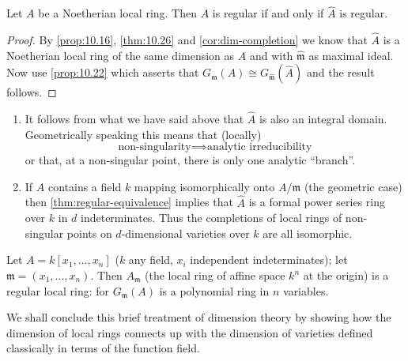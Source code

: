 \begin{proposition}\label{prop:regular-completion}
Let $A$ be a Noetherian local ring. Then $A$ is regular if and only if $\widehat{A}$ is regular.
\end{proposition}

\begin{proof}
By \eqref{prop:10.16}, \eqref{thm:10.26} and \eqref{cor:dim-completion} we know that $\widehat{A}$ is a Noetherian local ring of the same dimension as $A$ and with $\widehat{\mathfrak{m}}$ as maximal ideal. Now use \eqref{prop:10.22} which asserts that $G_{\mathfrak{m}}(A) \cong G_{\widehat{\mathfrak{m}}}(\widehat{A})$ and the result follows.
\end{proof}

\begin{remark}
\begin{enumerate}[1)]
    \item It follows from what we have said above that $\widehat{A}$ is also an integral domain. Geometrically speaking this means that (locally)
    \[
        \text{non-singularity} \implies \text{analytic irreducibility}
    \]
    or that, at a non-singular point, there is only one analytic ``branch''.
    
    \item If $A$ contains a field $k$ mapping isomorphically onto $A/\mathfrak{m}$ (the geometric case) then \eqref{thm:regular-equivalence} implies that $\widehat{A}$ is a formal power series ring over $k$ in $d$ indeterminates. Thus the completions of local rings of non-singular points on $d$-dimensional varieties over $k$ are all isomorphic.
\end{enumerate}
\end{remark}

\begin{example}
Let $A = k[x_1, \ldots, x_n]$ ($k$ any field, $x_i$ independent indeterminates); let $\mathfrak{m} = (x_1, \ldots, x_n)$. Then $A_{\mathfrak{m}}$ (the local ring of affine space $k^n$ at the origin) is a regular local ring: for $G_{\mathfrak{m}}(A)$ is a polynomial ring in $n$ variables.
\end{example}

We shall conclude this brief treatment of dimension theory by showing how the dimension of local rings connects up with the dimension of varieties defined classically in terms of the function field.

